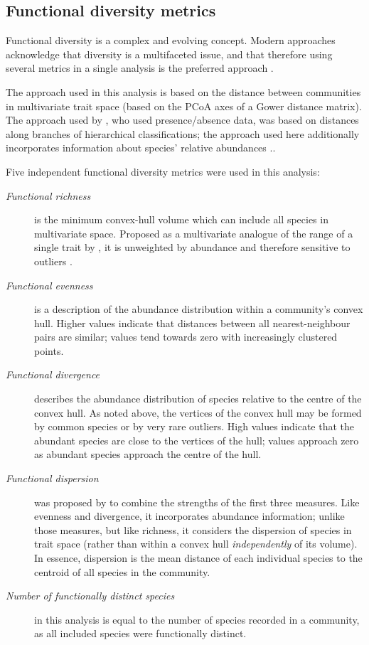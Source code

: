 \documentclass[12pt,a4paper]{book}
\begin{document}
\subsection{Functional diversity metrics}

Functional diversity is a complex and evolving concept. Modern approaches acknowledge that diversity is a multifaceted issue, and that therefore using several metrics in a single analysis is the preferred approach \citep{Laliberte2010}.

The approach used in this analysis is based on the distance between communities in multivariate trait space (based on the PCoA axes of a Gower distance matrix). The approach used by \citet{Mendez2012}, who used presence/absence data, was based on distances along branches of hierarchical classifications; the approach used here additionally incorporates information about species' relative abundances \citep{Villeger2008}..

Five independent functional diversity metrics were used in this analysis:

\begin{description}
\item[\textit{Functional richness}] is the minimum convex-hull volume which can include all species in multivariate space. Proposed as a multivariate analogue of the range of a single trait by \citet{Villeger2008}, it is unweighted by abundance and therefore sensitive to outliers \citep{Laliberte2010}.
\item[\textit{Functional evenness}] is a description of the abundance distribution within a community's convex hull. Higher values indicate that distances between all nearest-neighbour pairs are similar; values tend towards zero with increasingly clustered points.
\item[\textit{Functional divergence}] describes the abundance distribution of species relative to the centre of the convex hull. As noted above, the vertices of the convex hull may be formed by common species or by very rare outliers. High values indicate that the abundant species are close to the vertices of the hull; values approach zero as abundant species approach the centre of the hull.
\item[\textit{Functional dispersion}] was proposed by \citet{Laliberte2010} to combine the strengths of the first three measures. Like evenness and divergence, it incorporates abundance information; unlike those measures, but like richness, it considers the dispersion of species in trait space (rather than within a convex hull \textit{independently} of its volume). In essence, dispersion is the mean distance of each individual species to the centroid of all species in the community.
\item[\textit{Number of functionally distinct species}] in this analysis is equal to the number of species recorded in a community, as all included species were functionally distinct.
\end{description}
\end{document}
